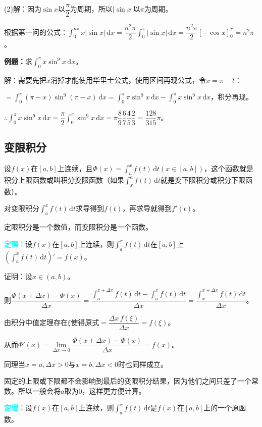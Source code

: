 \documentclass[UTF8, 12pt]{ctexart}
\begin{document}
(2)解：因为$\sin x$以$\dfrac{\pi}{2}$为周期，所以$\vert\sin x\vert$以$\pi$为周期。

根据第一问的公式：$\int_0^{n\pi}x\vert\sin x\vert\,\textrm{d}x=\dfrac{n^2\pi}{2}\int_0^\pi\vert\sin x\vert\,\textrm{d}x=\dfrac{n^2\pi}{2}[-\cos x]_0^\pi=n^2\pi$。

\textbf{例题：}求$\int_0^\pi x\sin^9x\,\textrm{d}x$。

解：需要先把$x$消掉才能使用华里士公式，使用区间再现公式，令$x=\pi-t$：

$=\int_0^\pi(\pi-x)\sin^9(\pi-x)\,\textrm{d}x=\int_0^\pi\pi\sin^9x\,\textrm{d}x-\int_0^\pi x\sin^9x\,\textrm{d}x$，积分再现。

$\therefore\int_0^\pi x\sin^9x\,\textrm{d}x=\dfrac{\pi}{2}\int_0^\pi\sin^9x\,\textrm{d}x=\pi\dfrac{8}{9}\dfrac{6}{7}\dfrac{4}{5}\dfrac{2}{3}=\dfrac{128}{315}\pi$。

\subsection{变限积分}

设$f(x)$在$[a,b]$上连续，且$\Phi(x)=\int_a^xf(t)\,\textrm{d}t(x\in[a,b])$，这个函数就是积分上限函数或叫积分变限函数（如果$\int_x^af(t)\,\textrm{d}t$就是变下限积分或积分下限函数）。

对变限积分$\int_{a}^xf(t)\,\textrm{d}t$求导得到$f(t)$，再求导就得到$f'(t)$。

定限积分是一个数值，而变限积分是一个函数。

\textcolor{aqua}{\textbf{定理：}}设$f(x)$在$[a,b]$上连续，则$\int_a^xf(t)\,\textrm{d}t$在$[a,b]$上$(\int_a^xf(t)\,\textrm{d}t)'=f(x)$。

证明：设$x\in(a,b)$。

则$\dfrac{\Phi(x+\Delta x)-\Phi(x)}{\Delta x}=\dfrac{\int_a^{x+\Delta x}f(t)\,\textrm{d}t-\int_a^xf(t)\,\textrm{d}t}{\Delta x}=\dfrac{\int_x^{x+\Delta x}f(t)\,\textrm{d}t}{\Delta x}$。

由积分中值定理存在$\xi$使得原式$=\dfrac{\Delta x\,f(\xi)}{\Delta x}=f(\xi)$。

从而$\Phi'(x)=\lim\limits_{\Delta x\to 0}\dfrac{\Phi(x+\Delta x)-\Phi(x)}{\Delta x}=f(x)$。

同理当$x=a,\Delta x>0$与$x=b,\Delta x<0$时也同样成立。

固定的上限或下限都不会影响到最后的变限积分结果，因为他们之间只差了一个常数。所以一般会将$a$取为0，这样更方便计算。

\textcolor{aqua}{\textbf{定理：}}设$f(x)$在$[a,b]$上连续，则$\int_a^xf(t)\,\textrm{d}t$是$f(x)$在$[a,b]$上的一个原函数。
\end{document}
